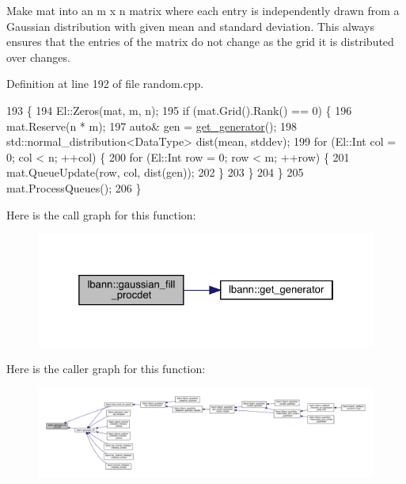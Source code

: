 Make mat into an m x n matrix where each entry is independently drawn from a Gaussian distribution with given mean and standard deviation. This always ensures that the entries of the matrix do not change as the grid it is distributed over changes. 

Definition at line 192 of file random.\+cpp.


\begin{DoxyCode}
193                                             \{
194   El::Zeros(mat, m, n);
195   \textcolor{keywordflow}{if} (mat.Grid().Rank() == 0) \{
196     mat.Reserve(n * m);
197     \textcolor{keyword}{auto}& gen = \hyperlink{namespacelbann_a4fea7ba21017b49d1e34394b4c20c764}{get\_generator}();
198     std::normal\_distribution<DataType> dist(mean, stddev);
199     \textcolor{keywordflow}{for} (El::Int col = 0; col < n; ++col) \{
200       \textcolor{keywordflow}{for} (El::Int row = 0; row < m; ++row) \{
201         mat.QueueUpdate(row, col, dist(gen));
202       \}
203     \}
204   \}
205   mat.ProcessQueues();
206 \}
\end{DoxyCode}
Here is the call graph for this function\+:\nopagebreak
\begin{figure}[H]
\begin{center}
\leavevmode
\includegraphics[width=325pt]{namespacelbann_a2f40602f0503f9737325bb267e5c4dcc_cgraph}
\end{center}
\end{figure}
Here is the caller graph for this function\+:\nopagebreak
\begin{figure}[H]
\begin{center}
\leavevmode
\includegraphics[width=350pt]{namespacelbann_a2f40602f0503f9737325bb267e5c4dcc_icgraph}
\end{center}
\end{figure}
\mbox{\label{namespacelbann_a4b08fd1410911d1303176bafa031fcb4}} 
